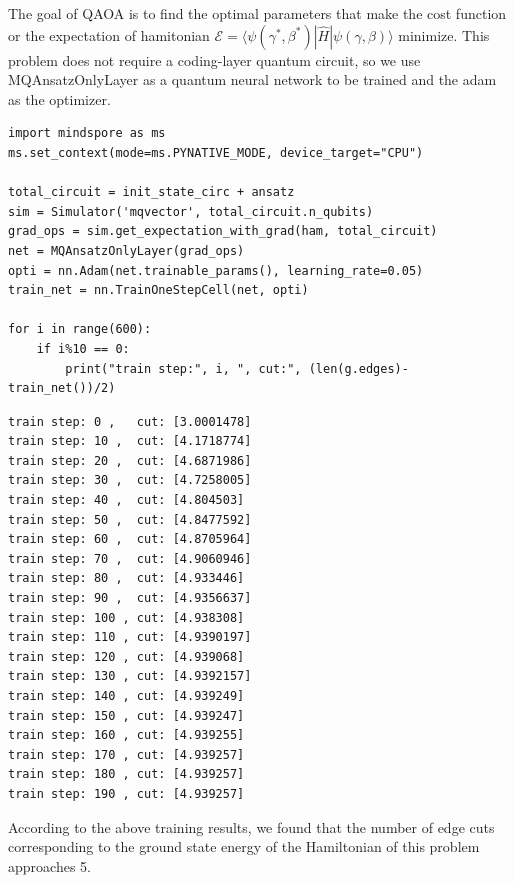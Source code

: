The goal of QAOA is to find the optimal parameters that make the cost function or the expectation of hamitonian $\mathcal{E}=\langle \psi(\gamma^*, \beta^*)|\hat{H}|\psi(\gamma, \beta)\rangle$ minimize.
This problem does not require a coding-layer quantum circuit, so we use MQAnsatzOnlyLayer as a quantum neural network to be trained and the adam as the optimizer.
\begin{lstlisting}
import mindspore as ms
ms.set_context(mode=ms.PYNATIVE_MODE, device_target="CPU")

total_circuit = init_state_circ + ansatz
sim = Simulator('mqvector', total_circuit.n_qubits)
grad_ops = sim.get_expectation_with_grad(ham, total_circuit)
net = MQAnsatzOnlyLayer(grad_ops)
opti = nn.Adam(net.trainable_params(), learning_rate=0.05)
train_net = nn.TrainOneStepCell(net, opti)

for i in range(600):
    if i%10 == 0:
        print("train step:", i, ", cut:", (len(g.edges)-train_net())/2)
\end{lstlisting}
\begin{lstlisting}
train step: 0 ,   cut: [3.0001478]
train step: 10 ,  cut: [4.1718774]
train step: 20 ,  cut: [4.6871986]
train step: 30 ,  cut: [4.7258005]
train step: 40 ,  cut: [4.804503]
train step: 50 ,  cut: [4.8477592]
train step: 60 ,  cut: [4.8705964]
train step: 70 ,  cut: [4.9060946]
train step: 80 ,  cut: [4.933446]
train step: 90 ,  cut: [4.9356637]
train step: 100 , cut: [4.938308]
train step: 110 , cut: [4.9390197]
train step: 120 , cut: [4.939068]
train step: 130 , cut: [4.9392157]
train step: 140 , cut: [4.939249]
train step: 150 , cut: [4.939247]
train step: 160 , cut: [4.939255]
train step: 170 , cut: [4.939257]
train step: 180 , cut: [4.939257]
train step: 190 , cut: [4.939257]
\end{lstlisting}

According to the above training results, we found that the number of edge cuts corresponding to the ground state energy of the Hamiltonian of this problem approaches 5.

